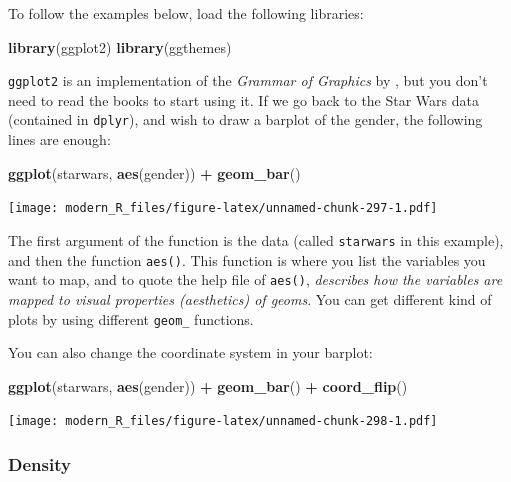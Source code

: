 \documentclass[]{gitbook}
\newenvironment{Shaded}{\begin{snugshade}}{\end{snugshade}}
\newcommand{\KeywordTok}[1]{\textcolor[rgb]{0.13,0.29,0.53}{\textbf{#1}}}
\newcommand{\NormalTok}[1]{#1}
\newcommand{\OperatorTok}[1]{\textcolor[rgb]{0.81,0.36,0.00}{\textbf{#1}}}
\newcommand{\StringTok}[1]{\textcolor[rgb]{0.31,0.60,0.02}{#1}}
\theoremstyle{definition}
\theoremstyle{definition}
\theoremstyle{definition}
\theoremstyle{remark}
\begin{document}
To follow the examples below, load the following libraries:

\begin{Shaded}
\begin{Highlighting}[]
\KeywordTok{library}\NormalTok{(ggplot2)}
\KeywordTok{library}\NormalTok{(ggthemes)}
\end{Highlighting}
\end{Shaded}

\texttt{ggplot2} is an implementation of the \emph{Grammar of Graphics}
by \citet{wilkinson2006}, but you don't need to read the books to start
using it. If we go back to the Star Wars data (contained in
\texttt{dplyr}), and wish to draw a barplot of the gender, the following
lines are enough:

\begin{Shaded}
\begin{Highlighting}[]
\KeywordTok{ggplot}\NormalTok{(starwars, }\KeywordTok{aes}\NormalTok{(gender)) }\OperatorTok{+}
\StringTok{  }\KeywordTok{geom_bar}\NormalTok{()}
\end{Highlighting}
\end{Shaded}

\texttt{[image: modern\_R\_files/figure-latex/unnamed-chunk-297-1.pdf]}

The first argument of the function is the data (called \texttt{starwars}
in this example), and then the function \texttt{aes()}. This function is
where you list the variables you want to map, and to quote the help file
of \texttt{aes()}, \emph{describes how the variables are mapped to
visual properties (aesthetics) of geoms}. You can get different kind of
plots by using different \texttt{geom\_} functions.

You can also change the coordinate system in your barplot:

\begin{Shaded}
\begin{Highlighting}[]
\KeywordTok{ggplot}\NormalTok{(starwars, }\KeywordTok{aes}\NormalTok{(gender)) }\OperatorTok{+}
\StringTok{  }\KeywordTok{geom_bar}\NormalTok{() }\OperatorTok{+}
\StringTok{  }\KeywordTok{coord_flip}\NormalTok{()}
\end{Highlighting}
\end{Shaded}

\texttt{[image: modern\_R\_files/figure-latex/unnamed-chunk-298-1.pdf]}

\hypertarget{density}{%
\subsubsection{Density}\label{density}}
\end{document}
